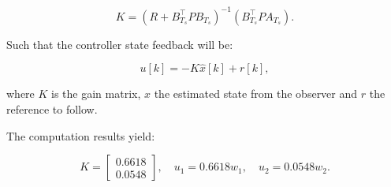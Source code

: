 \[
K = \left( R + B_{T_s}^\top P B_{T_s} \right)^{-1} \left(B_{T_s}^\top P A_{T_s} \right).
\]

Such that the controller state feedback will be:

\[
u[k] = -K \hat{x}[k] + r[k],
\]

where \( K \) is the gain matrix, $\hat{x}$ the estimated state from the observer and $r$ the reference to follow.

The computation results yield:

\[
K = \begin{bmatrix}
0.6618 \\ 0.0548
\end{bmatrix}, \quad u_{1} = 0.6618 w_{1}, \quad u_{2} = 0.0548 w_{2}.
\]
